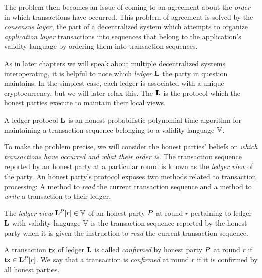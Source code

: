 The problem then becomes an issue of coming to an agreement about the
\emph{order} in which transactions have occurred. This problem of agreement is
solved by the \emph{consensus layer}, the part of a decentralized system which
attempts to organize \emph{application layer} transactions into sequences that
belong to the application's validity language by ordering them into transaction
sequences.

As in later chapters we will speak about multiple decentralized systems
interoperating, it is helpful to note which \emph{ledger} $\mathbf{L}$
the party in question maintains. In the simplest case, each ledger is associated
with a unique cryptocurrency, but we will later relax this. The $\mathbf{L}$ is the
protocol which the honest parties execute to maintain their local views.

\begin{definition}[Ledger]
  A ledger protocol $\mathbf{L}$ is an honest probabilistic polynomial-time
  algorithm for maintaining a transaction sequence belonging to a validity
  language $\mathbb{V}$.
\end{definition}

To make the problem precise, we will consider the honest parties' beliefs on
\emph{which transactions have occurred and what their order is}. The transaction
sequence reported by an honest party at a particular round is known as the
\emph{ledger view} of the party. An honest party's protocol exposes two
methods related to transaction processing: A method to \emph{read} the current
transaction sequence and a method to \emph{write} a transaction to their ledger.

\begin{definition}
  The \emph{ledger view} $\mathbf{L}^{P}[r] \in \mathbb{V}$ of an honest
  party $P$ at round $r$ pertaining to ledger $\mathbf{L}$ with validity
  language $\mathbb{V}$ is the transaction sequence reported by the honest party
  when it is given the instruction to \emph{read} the current transaction
  sequence.
\end{definition}

\begin{definition}[Confirmation]
  A transaction $\mathsf{tx}$ of ledger $\mathbf{L}$ is called \emph{confirmed} by honest
  party $P$ at round $r$ if $\mathsf{tx} \in \mathbf{L}^{P}[r]$. We say
  that a transaction is \emph{confirmed} at round $r$ if it is confirmed by all
  honest parties.
\end{definition}

